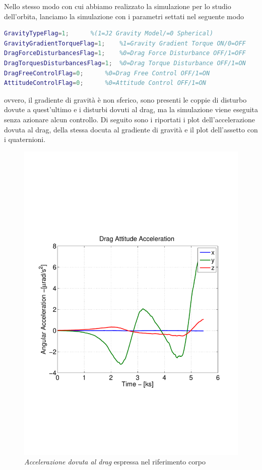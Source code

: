 Nello stesso modo con cui abbiamo realizzato la simulazione per lo studio
dell'orbita, lanciamo la simulazione con i parametri settati nel seguente modo
\begin{lstlisting}[language=matlab,breaklines=true]
GravityTypeFlag=1;		%(1=J2 Gravity Model/=0 Spherical)
GravityGradientTorqueFlag=1;	%1=Gravity Gradient Torque ON/0=OFF 
DragForceDisturbancesFlag=1;	%0=Drag Force Disturbance OFF/1=OFF
DragTorquesDisturbancesFlag=1;	%0=Drag Torque Disturbance OFF/1=ON
DragFreeControlFlag=0;		%0=Drag Free Control OFF/1=ON
AttitudeControlFlag=0;		%0=Attitude Control OFF/1=ON
\end{lstlisting}
ovvero, il gradiente di gravità è non sferico, sono presenti le coppie di
disturbo dovute a quest'ultimo e i disturbi dovuti al drag, ma la simulazione
viene eseguita senza azionare alcun controllo.
Di seguito sono i riportati i plot dell'accelerazione dovuta al drag, della
stessa docuta al gradiente di gravità e il plot dell'assetto con i quaternioni.

\begin{figure}
	\includegraphics[width=.6\textwidth,clip=true,trim=1cm
	6cm
	1cm
	8cm]{modelling/attitude_kinematics_and_dynamics/image/DragAttitudeAcceleration.pdf}
	\caption{\emph{Accelerazione dovuta al drag} espressa nel riferimento corpo}
	\label{fig:drag-acceleration}
\end{figure}

